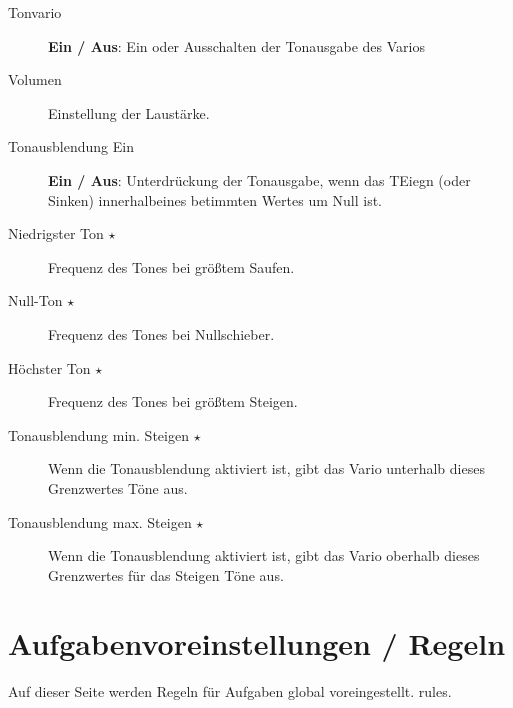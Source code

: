 \begin{description}
\item[Tonvario]  {\bf Ein / Aus}:  Ein oder Ausschalten der Tonausgabe des Varios
\item[Volumen]  Einstellung der Laustärke.
\item[Tonausblendung Ein]  {\bf Ein / Aus}: Unterdrückung der Tonausgabe, wenn das TEiegn (oder Sinken) innerhalbeines betimmten Wertes um Null ist.
\item[Niedrigster Ton $\star$]  Frequenz des Tones bei größtem Saufen.
\item[Null-Ton $\star$]  Frequenz des Tones bei Nullschieber.
\item[Höchster Ton $\star$]  Frequenz des Tones bei größtem Steigen.
\item[Tonausblendung min. Steigen $\star$]  Wenn die Tonausblendung aktiviert ist, gibt das Vario unterhalb dieses Grenzwertes Töne aus.
\item[Tonausblendung max. Steigen $\star$]  Wenn die Tonausblendung aktiviert ist, gibt das Vario oberhalb dieses Grenzwertes für das Steigen Töne aus.
\end{description}


\section{Aufgabenvoreinstellungen  / Regeln}

Auf dieser Seite werden Regeln für Aufgaben global voreingestellt.
rules. \label{conf:taskrules}

